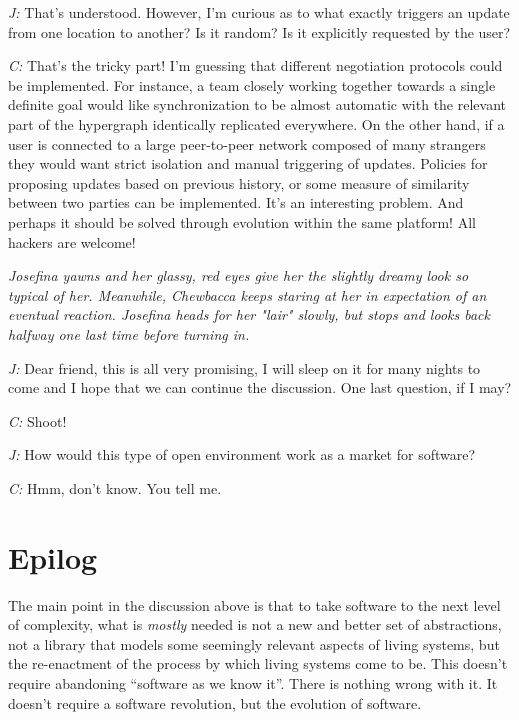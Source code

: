\documentclass[10pt]{sigplanconf}
\begin{document}
\emph{J:} That's understood. However, I'm curious as to what exactly triggers an update from one location to another? Is it random? Is it explicitly requested by the user?

\emph{C:} That's the tricky part! I'm guessing that different negotiation protocols could be implemented. For instance, a team closely working together towards a single definite goal would like synchronization to be almost automatic with the relevant part of the hypergraph identically replicated everywhere. On the other hand, if a user is connected to a large peer-to-peer network composed of many strangers they would want strict isolation and manual triggering of updates. Policies for proposing updates based on previous history, or some measure of similarity between two parties can be implemented. It's an interesting problem. And perhaps it should be solved through evolution within the same platform! All hackers are welcome!

\emph{Josefina yawns and her glassy, red eyes give her the slightly dreamy look so typical of her. Meanwhile, Chewbacca keeps staring at her in expectation of an eventual reaction.  Josefina heads for her "lair" slowly, but stops and looks back halfway one last time before turning in.}

\emph{J:} Dear friend, this is all very promising, I will sleep on it for many nights to come and I hope that we can continue the discussion. One last question, if I may?

\emph{C:} Shoot!

\emph{J:} How would this type of open environment work as a market for software?

\emph{C:} Hmm, don't know. You tell me. 

\section{Epilog}

The main point in the discussion above is that to take software to the next level of complexity, what is \emph{mostly} needed is not a new and better set of abstractions, not a library that models some seemingly relevant aspects of living systems, but the re-enactment of the process by which living systems come to be. This doesn't require abandoning ``software as we know it''. There is nothing wrong with it. It doesn't require a software revolution, but the evolution of software.
\end{document}
